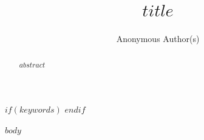 \documentclass[manuscript,review,anonymous]{acmart}
\begin{document}
\title[Knowledge Availability for AI in Developer Ecosystems]{$title$}
\author{Anonymous Author(s)}

\begin{abstract}
$abstract$
\end{abstract}
$if(keywords)$
$endif$
\maketitle

$body$


\end{document}
